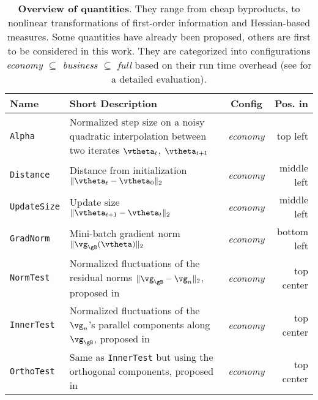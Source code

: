 {\def\arraystretch{1.2}
\begin{table*}
	\caption{\textbf{Overview of \cockpittitle quantities}. They range from
		cheap byproducts, to nonlinear transformations of first-order information
		and Hessian-based measures. Some quantities have already been proposed,
		others are first to be considered in this work. They are categorized into
		configurations \textit{economy $\subseteq$ business $\subseteq$ full} based on their
		run time overhead (see  for a detailed evaluation).}
	\label{tab:overview-quantities}
	\begin{center}
    \begin{tabularx}{\textwidth}{lXcr}
    	\toprule
    	\textbf{Name}       & \textbf{Short Description}                                                                                           & \textbf{Config}   & \textbf{Pos. in \Cref{fig:showcase}}  \\
    	\midrule
    	\texttt{Alpha}      & Normalized step size on a noisy quadratic interpolation between two iterates $\vtheta_t$, $\vtheta_{t+1}$            & \textit{economy}  & top \textcolor{sns_blue}{left}        \\
    	\texttt{Distance}   & Distance from initialization $\lVert \vtheta_{t} -  \vtheta_{0}  \rVert_2$                                           & \textit{economy}  & middle \textcolor{sns_blue}{left}     \\
    	\texttt{UpdateSize} & Update size $\lVert \vtheta_{t + 1} - \vtheta_{t} \rVert_2$                                                          & \textit{economy}  & middle \textcolor{sns_blue}{left}     \\
    	\texttt{GradNorm}   & Mini-batch gradient norm $\lVert \vg_{\gB}(\vtheta) \rVert_2$                                                        & \textit{economy}  & bottom \textcolor{sns_blue}{left}     \\
    	\texttt{NormTest}   & Normalized fluctuations of the residual norms ${\lVert  \vg_{\gB} - \vg_n \rVert_2}$, proposed in \citep{Byrd2012}   & \textit{economy}  & top \textcolor{sns_orange}{center}    \\
    	\texttt{InnerTest}  & Normalized fluctuations of the $\vg_n$'s parallel components along $\vg_{\gB}$, proposed in \citep{Bollapragada2017} & \textit{economy}  & top \textcolor{sns_orange}{center}    \\
    	\texttt{OrthoTest}  & Same as \texttt{InnerTest} but using the orthogonal components, proposed in \citep{Bollapragada2017}                 & \textit{economy}  & top \textcolor{sns_orange}{center}    \\

\end{tabularx}
\end{center}
\end{table*}}
